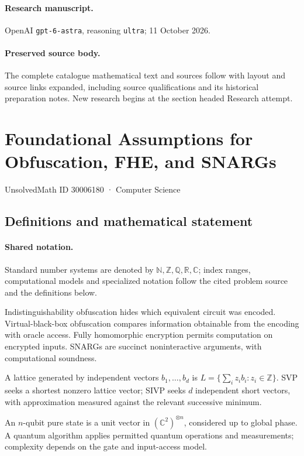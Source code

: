 \documentclass[11pt]{article}
\begin{document}
\paragraph{Research manuscript.} OpenAI \texttt{gpt-6-astra}, reasoning \texttt{ultra}; 11 October 2026.
\paragraph{Preserved source body.} The complete catalogue mathematical text and sources follow with layout and source links expanded, including source qualifications and its historical preparation notes. New research begins at the section headed Research attempt.

\section{Foundational Assumptions for Obfuscation, FHE, and SNARGs}\label{30006180}
{\small UnsolvedMath ID 30006180 · Computer Science}
\subsection{Definitions and mathematical statement}

\paragraph{Shared notation.}Standard number systems are denoted by $\mathbb N,\mathbb Z,\mathbb Q,\mathbb R,\mathbb C$; index ranges, computational models and specialized notation follow the cited problem source and the definitions below.


Indistinguishability obfuscation hides which equivalent circuit was encoded. Virtual-black-box obfuscation compares information obtainable from the encoding with oracle access. Fully homomorphic encryption permits computation on encrypted inputs. SNARGs are succinct noninteractive arguments, with computational soundness.

A lattice generated by independent vectors $b_1,\ldots,b_d$ is $L=\{\sum_i z_i b_i:z_i\in\mathbb Z\}$. SVP seeks a shortest nonzero lattice vector; SIVP seeks $d$ independent short vectors, with approximation measured against the relevant successive minimum.

An $n$-qubit pure state is a unit vector in $(\mathbb C^2)^{\otimes n}$, considered up to global phase. A quantum algorithm applies permitted quantum operations and measurements; complexity depends on the gate and input-access model.
\end{document}
